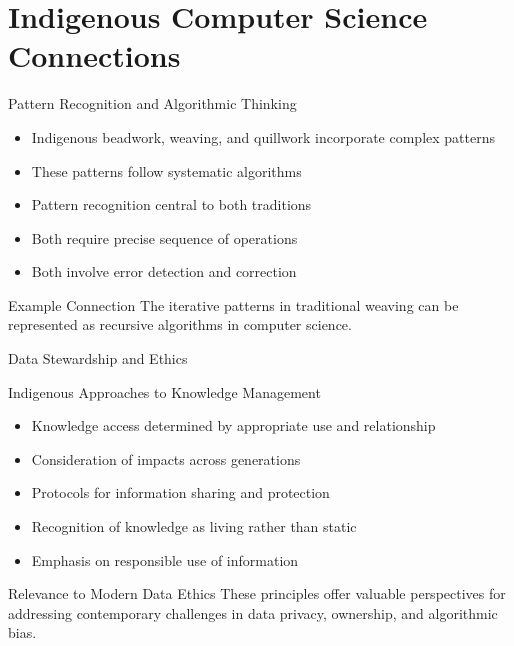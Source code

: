 \documentclass{beamer}
\begin{document}
\section{Indigenous Computer Science Connections}

\begin{frame}{Pattern Recognition and Algorithmic Thinking}
   
        \begin{itemize}
            \item Indigenous beadwork, weaving, and quillwork incorporate complex patterns
            \item These patterns follow systematic algorithms
            \item Pattern recognition central to both traditions
            \item Both require precise sequence of operations
            \item Both involve error detection and correction
        \end{itemize}
    
    \begin{exampleblock}{Example Connection}
        The iterative patterns in traditional weaving can be represented as recursive algorithms in computer science.
    \end{exampleblock}
\end{frame}

\begin{frame}{Data Stewardship and Ethics}
    \begin{block}{Indigenous Approaches to Knowledge Management}
        \begin{itemize}
            \item Knowledge access determined by appropriate use and relationship
            \item Consideration of impacts across generations
            \item Protocols for information sharing and protection
            \item Recognition of knowledge as living rather than static
            \item Emphasis on responsible use of information
        \end{itemize}
    \end{block}
    
    \begin{block}{Relevance to Modern Data Ethics}
        These principles offer valuable perspectives for addressing contemporary challenges in data privacy, ownership, and algorithmic bias.
    \end{block}
\end{frame}
\end{document}
